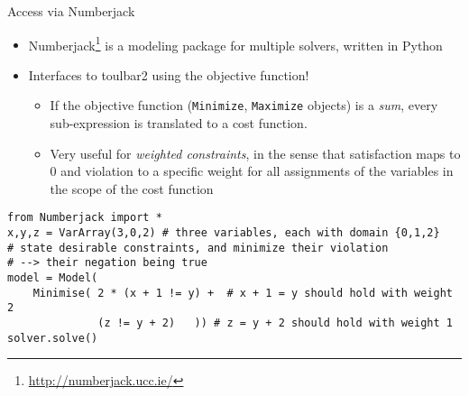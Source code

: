 \documentclass[handout,10pt,xcolor={dvipsnames},fleqn]{beamer}
\begin{document}
\begin{frame}[fragile]{Access via Numberjack}
\begin{itemize}
\item Numberjack\footnote{\url{http://numberjack.ucc.ie/}}\cite{hebrard2010constraint} is a modeling package for multiple solvers, written in Python
\item Interfaces to toulbar2 using the \alert{objective} function!
\begin{itemize}
\item If the objective function (\texttt{Minimize}, \texttt{Maximize} objects) is a \emph{sum},
every sub-expression is translated to a cost function.
\item Very useful for \emph{weighted constraints}, in the sense that satisfaction maps to 0 and violation 
to a specific weight for all assignments of the variables in the scope of the cost function
\end{itemize}
\end{itemize}

\lstset{language=python}
\begin{lstlisting}
from Numberjack import * 
x,y,z = VarArray(3,0,2) # three variables, each with domain {0,1,2}
# state desirable constraints, and minimize their violation
# --> their negation being true
model = Model(
    Minimise( 2 * (x + 1 != y) +  # x + 1 = y should hold with weight 2
              (z != y + 2)   )) # z = y + 2 should hold with weight 1
solver.solve()
\end{lstlisting}

\lstset{language=mzn}

\end{frame}
\end{document}
